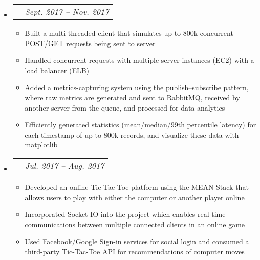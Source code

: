 \documentclass[letterpaper,11pt]{article}
\makeatletter
\newcommand{\resitem}[1]{\item #1 \vspace{-2pt}}
\newcommand{\ressubheadingproj}[4]{
\begin{tabular*}{6.5in}{l@{\extracolsep{\fill}}r}
    \textbf{#1} & \textit{#2} \\
\end{tabular*}\vspace{-6pt}}
\makeatother
\begin{document}
    \begin{itemize}
        \item\ressubheadingproj
        {\href
        {https://github.com/jeremylinlin/cs6650-scalable-distributed-systems}
        {Distributed Ski Data Processing Engine}
        }
        {Sept. 2017 -- Nov. 2017}
        {}{}  %
        {\footnotesize
        \begin{itemize}
            \resitem
            {Built a multi-threaded client that simulates up to 800k concurrent POST/GET
            requests being sent to server}
            \resitem
            {Handled concurrent requests with multiple server instances (EC2)
            with a load balancer (ELB)}
            \resitem
            {Added a metrics-capturing system using the publish--subscribe pattern, where
            raw metrics are generated and sent to RabbitMQ, received by another server
            from the queue, and processed for data analytics}
            \resitem
            {Efficiently generated statistics (mean/median/99th percentile latency) for
            each timestamp of up to 800k records, and visualize these data with matplotlib}

        \end{itemize}
        }
    \end{itemize}

    \begin{itemize}
        \item\ressubheadingproj
        {\href
        {https://github.com/jeremylinlin/tic-tac-toe-mean}
        {Multiplayer Tic-Tac-Toe Platform}
        }
        {Jul. 2017 -- Aug. 2017}
        {}{}  %
        {\footnotesize
        \begin{itemize}
            \resitem
            {Developed an online Tic-Tac-Toe platform using the MEAN Stack that allows
            users to play with either the computer or another player online}
            \resitem{Incorporated Socket IO into the project which enables real-time
            communications between multiple connected clients in an online game}
            \resitem{Used Facebook/Google Sign-in services for social login and consumed a
            third-party Tic-Tac-Toe API for recommendations of computer moves}
        \end{itemize}
        }
    \end{itemize}
\end{document}
